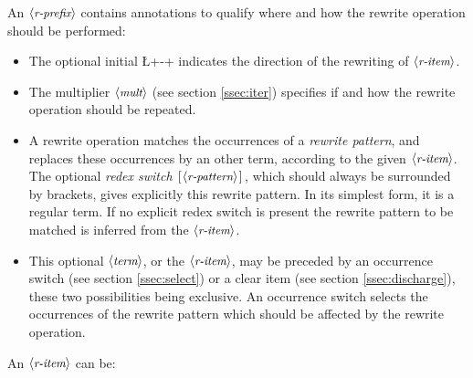 

An $\langle\mbox{\itshape\rmfamily\small r-prefix}\rangle$ contains annotations to qualify where and how   the
rewrite operation should be performed:
\begin{itemize}
\item The optional initial \L+-+ indicates the direction of the rewriting
  of $\langle\mbox{\itshape\rmfamily\small r-item}\rangle$.
\item The multiplier $\langle\mbox{\itshape\rmfamily\small mult}\rangle$ (see section \ref{ssec:iter})
  specifies if and how the rewrite operation should be repeated.
\item A rewrite operation matches the occurrences of a \emph{rewrite
  pattern}, and replaces these occurrences by an other term, according
  to the given $\langle\mbox{\itshape\rmfamily\small r-item}\rangle$.
  The optional \emph{redex switch} $\C{[}\N{r-pattern}\C{]}$, which
  should always be surrounded by brackets, gives explicitly this
  rewrite pattern. In its simplest form, it is a regular term.
  If no explicit redex switch
  is present the rewrite pattern to be matched is inferred from the
  $\langle\mbox{\itshape\rmfamily\small r-item}\rangle$.
\item This optional $\langle\mbox{\itshape\rmfamily\small term}\rangle$, or
  the $\langle\mbox{\itshape\rmfamily\small r-item}\rangle$, may be preceded by an
  occurrence switch (see section \ref{ssec:select}) or a clear item
  (see section \ref{ssec:discharge}), these two possibilities being
  exclusive. An occurrence switch selects the occurrences of the
  rewrite pattern which should be affected by the rewrite operation.
\end{itemize}


An $\langle\mbox{\itshape\rmfamily\small r-item}\rangle$ can be:


